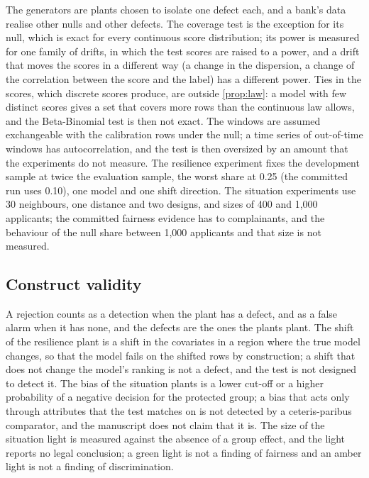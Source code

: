 The generators are plants chosen to isolate one defect each, and a bank's data realise other nulls and other defects. The coverage test is the exception for its null, which is exact for every continuous score distribution; its power is measured for one family of drifts, in which the test scores are raised to a power, and a drift that moves the scores in a different way (a change in the dispersion, a change of the correlation between the score and the label) has a different power. Ties in the scores, which discrete scores produce, are outside \cref{prop:law}: a model with few distinct scores gives a set that covers more rows than the continuous law allows, and the Beta-Binomial test is then not exact. The windows are assumed exchangeable with the calibration rows under the null; a time series of out-of-time windows has autocorrelation, and the test is then oversized by an amount that the experiments do not measure. The resilience experiment fixes the development sample at twice the evaluation sample, the worst share at 0.25 (the committed run uses 0.10), one model and one shift direction. The situation experiments use 30 neighbours, one distance and two designs, and sizes of 400 and 1,000 applicants; the committed fairness evidence has \CmFairQMin{} to \CmFairQMax{} complainants, and the behaviour of the null share between 1,000 applicants and that size is not measured.

\subsection{Construct validity}

A rejection counts as a detection when the plant has a defect, and as a false alarm when it has none, and the defects are the ones the plants plant. The shift of the resilience plant is a shift in the covariates in a region where the true model changes, so that the model fails on the shifted rows by construction; a shift that does not change the model's ranking is not a defect, and the test is not designed to detect it. The bias of the situation plants is a lower cut-off or a higher probability of a negative decision for the protected group; a bias that acts only through attributes that the test matches on is not detected by a ceteris-paribus comparator, and the manuscript does not claim that it is. The size of the situation light is measured against the absence of a group effect, and the light reports no legal conclusion; a green light is not a finding of fairness and an amber light is not a finding of discrimination.

